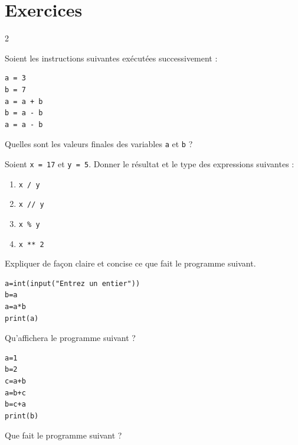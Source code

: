 \newpage

\section{Exercices}
 {
  \small
  \setlength{\columnseprule}{0.6pt}
  \begin{multicols}{2}

	  \begin{exo}
		  Soient les instructions suivantes exécutées successivement :

		  \begin{lstlisting}
a = 3
b = 7
a = a + b
b = a - b
a = a - b
\end{lstlisting}

		  Quelles sont les valeurs finales des variables \lstinline|a| et \lstinline|b| ?
	  \end{exo}

	  \begin{exo}
		  Soient \lstinline|x = 17| et \lstinline|y = 5|. Donner le résultat et le type des expressions suivantes :
		  \begin{enumerate}[label=\alph*)]
			  \item \lstinline|x / y|
			  \item \lstinline|x // y|
			  \item \lstinline|x % y|
			  \item \lstinline|x ** 2|
		  \end{enumerate}
	  \end{exo}

	  \begin{exo}{}
		  Expliquer de façon claire et concise ce que fait le programme suivant.

		  \begin{lstlisting}
a=int(input("Entrez un entier"))
b=a
a=a*b
print(a)
\end{lstlisting}
	  \end{exo}

	  \begin{exo}{}
		  Qu'affichera le programme suivant ?

		  \begin{lstlisting}
a=1
b=2
c=a+b
a=b+c
b=c+a
print(b)
\end{lstlisting}
	  \end{exo}

	  \begin{exo}{}
		  Que fait le programme suivant ?


\end{exo}
\end{multicols}}

